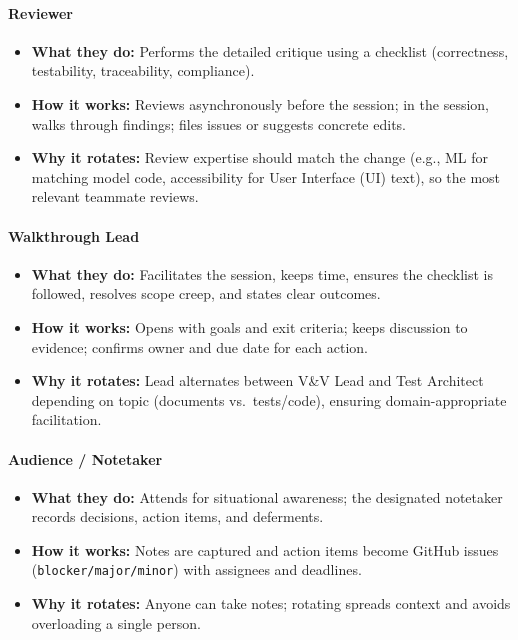 \documentclass[12pt, titlepage]{article}
\begin{document}
\paragraph{Reviewer}
\begin{itemize}
  \item \textbf{What they do:} Performs the detailed critique using a checklist (correctness, testability, traceability, compliance).
  \item \textbf{How it works:} Reviews asynchronously before the session; in the session, walks through findings; files issues or suggests concrete edits.
  \item \textbf{Why it rotates:} Review expertise should match the change (e.g., ML for matching model code, accessibility for User Interface (UI) text), so the most relevant teammate reviews.
\end{itemize}

\paragraph{Walkthrough Lead}
\begin{itemize}
  \item \textbf{What they do:} Facilitates the session, keeps time, ensures the checklist is followed, resolves scope creep, and states clear outcomes.
  \item \textbf{How it works:} Opens with goals and exit criteria; keeps discussion to evidence; confirms owner and due date for each action.
  \item \textbf{Why it rotates:} Lead alternates between V\&V Lead and Test Architect depending on topic (documents vs.\ tests/code), ensuring domain-appropriate facilitation.
\end{itemize}

\paragraph{Audience / Notetaker}
\begin{itemize}
  \item \textbf{What they do:} Attends for situational awareness; the designated notetaker records decisions, action items, and deferments.
  \item \textbf{How it works:} Notes are captured and action items become GitHub issues (\texttt{blocker/major/minor}) with assignees and deadlines.
  \item \textbf{Why it rotates:} Anyone can take notes; rotating spreads context and avoids overloading a single person.
\end{itemize}
\end{document}
